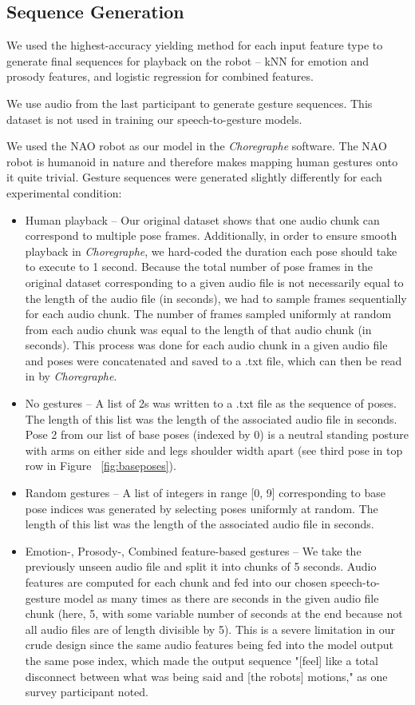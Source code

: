 \subsection{Sequence Generation}
We used the highest-accuracy yielding method for each input feature type to generate final sequences for playback on the robot -- kNN for emotion and prosody features, and logistic regression for combined features.

We use audio from the last participant to generate gesture sequences. This dataset is not used in training our speech-to-gesture models.

We used the NAO robot as our model in the \textit{Choregraphe} software. The NAO robot is humanoid in nature and therefore makes mapping human gestures onto it quite trivial. Gesture sequences were generated slightly differently for each experimental condition:
\begin{itemize}
\item Human playback -- Our original dataset shows that one audio chunk can correspond to multiple pose frames. Additionally, in order to ensure smooth playback in \textit{Choregraphe}, we hard-coded the duration each pose should take to execute to 1 second. Because the total number of pose frames in the original dataset corresponding to a given audio file is not necessarily equal to the length of the audio file (in seconds), we had to sample frames sequentially for each audio chunk. The number of frames sampled uniformly at random from each audio chunk was equal to the length of that audio chunk (in seconds). This process was done for each audio chunk in a given audio file and poses were concatenated and saved to a .txt file, which can then be read in by \textit{Choregraphe}.
\item No gestures -- A list of 2s was written to a .txt file as the sequence of poses. The length of this list was the length of the associated audio file in seconds. Pose 2 from our list of base poses (indexed by 0) is a neutral standing posture with arms on either side and legs shoulder width apart (see third pose in top row in Figure ~\ref{fig:baseposes}).
\item Random gestures -- A list of integers in range [0, 9] corresponding to base pose indices was generated by selecting poses uniformly at random. The length of this list was the length of the associated audio file in seconds.
\item Emotion-, Prosody-, Combined feature-based gestures -- We take the previously unseen audio file and split it into chunks of 5 seconds. Audio features are computed for each chunk and fed into our chosen speech-to-gesture model as many times as there are seconds in the given audio file chunk (here, 5, with some variable number of seconds at the end because not all audio files are of length divisible by 5). This is a severe limitation in our crude design since the same audio features being fed into the model output the same pose index, which made the output sequence "[feel] like a total disconnect between what was being said and [the robot\textquotesingle s] motions," as one survey participant noted.

\end{itemize}
